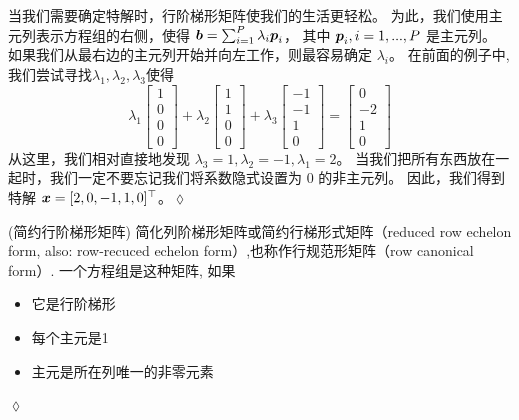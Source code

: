 \begin{remark}[求得特解]
    当我们需要确定特解时，行阶梯形矩阵使我们的生活更轻松。
    为此，我们使用主元列表示方程组的右侧，使得
    $\boldsymbol{b} = \sum_{i=1}^{P} \lambda_i \boldsymbol{p}_i$，
    其中 $\boldsymbol{p}_i , i = 1, ..., P$ 是主元列。
    如果我们从最右边的主元列开始并向左工作，则最容易确定 $\lambda_i$。
    在前面的例子中, 我们尝试寻找$\lambda_1, \lambda_2, \lambda_3$使得
    \begin{equation}
        \lambda_1
        \begin{bmatrix}
            1 \\ 0 \\ 0 \\ 0
        \end{bmatrix}+
        \lambda_2
        \begin{bmatrix}
            1 \\ 1 \\ 0 \\ 0
        \end{bmatrix}+
        \lambda_3
        \begin{bmatrix}
            -1 \\ -1 \\ 1 \\ 0
        \end{bmatrix}=
        \begin{bmatrix}
            0 \\ -2 \\ 1 \\ 0
        \end{bmatrix}
    \end{equation}
    从这里，我们相对直接地发现
    $\lambda_3 = 1, \lambda_2 = -1, \lambda_1 = 2$。
    当我们把所有东西放在一起时，我们一定不要忘记我们将系数隐式设置为 0 的非主元列。
    因此，我们得到 特解 $\boldsymbol{x} = [2, 0, -1, 1, 0]^\top$。\hfill$\lozenge$
\end{remark}

\begin{remark}
(简约行阶梯形矩阵)
简化列阶梯形矩阵或简约行梯形式矩阵（reduced row echelon form, also: row-recuced echelon form）,也称作行规范形矩阵（row canonical form）. 一个方程组是这种矩阵, 如果
\begin{itemize}
    \item 它是行阶梯形
    \item 每个主元是1
    \item 主元是所在列唯一的非零元素
\end{itemize}
\hfill $\lozenge$
\end{remark}

